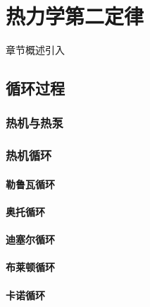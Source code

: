 \chapter{热力学第二定律}\label{11}

章节概述引入

\section{循环过程}\label{11-1}

\subsection{热机与热泵}\label{11-1-1}

\subsection{热机循环}\label{11-1-2}

\subsubsection{勒鲁瓦循环}\label{11-1-2-1}

\subsubsection{奥托循环}\label{11-1-2-2}

\subsubsection{迪塞尔循环}\label{11-1-2-3}

\subsubsection{布莱顿循环}\label{11-1-2-4}

\subsubsection{卡诺循环}\label{11-1-2-5}
